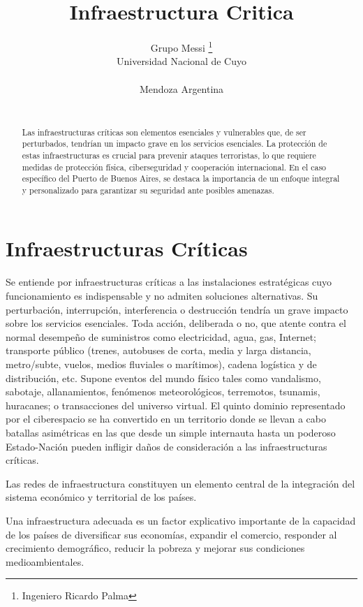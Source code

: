\documentclass{article}
\title{Infraestructura Critica}
\author{
    Grupo Messi
    \thanks{Ingeniero Ricardo Palma}
   \\
    Universidad Nacional de Cuyo \\
     \\
  Mendoza Argentina \\
  \texttt{} \\
  }
\begin{document}
\maketitle


\begin{abstract}
Las infraestructuras críticas son elementos esenciales y vulnerables
que, de ser perturbados, tendrían un impacto grave en los servicios
esenciales. La protección de estas infraestructuras es crucial para
prevenir ataques terroristas, lo que requiere medidas de protección
física, ciberseguridad y cooperación internacional. En el caso
específico del Puerto de Buenos Aires, se destaca la importancia de un
enfoque integral y personalizado para garantizar su seguridad ante
posibles amenazas.
\end{abstract}


\hypertarget{infraestructuras-cruxedticas}{%
\section{Infraestructuras Críticas}\label{infraestructuras-cruxedticas}}

Se entiende por infraestructuras críticas a las instalaciones
estratégicas cuyo funcionamiento es indispensable y no admiten
soluciones alternativas. Su perturbación, interrupción, interferencia o
destrucción tendría un grave impacto sobre los servicios esenciales.
Toda acción, deliberada o no, que atente contra el normal desempeño de
suministros como electricidad, agua, gas, Internet; transporte público
(trenes, autobuses de corta, media y larga distancia, metro/subte,
vuelos, medios fluviales o marítimos), cadena logística y de
distribución, etc. Supone eventos del mundo físico tales como
vandalismo, sabotaje, allanamientos, fenómenos meteorológicos,
terremotos, tsunamis, huracanes; o transacciones del universo virtual.
El quinto dominio representado por el ciberespacio se ha convertido en
un territorio donde se llevan a cabo batallas asimétricas en las que
desde un simple internauta hasta un poderoso Estado-Nación pueden
infligir daños de consideración a las infraestructuras críticas.

Las redes de infraestructura constituyen un elemento central de la
integración del sistema económico y territorial de los países.

Una infraestructura adecuada es un factor explicativo importante de la
capacidad de los países de diversificar sus economías, expandir el
comercio, responder al crecimiento demográfico, reducir la pobreza y
mejorar sus condiciones medioambientales.
\end{document}
